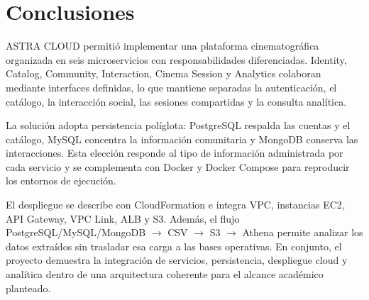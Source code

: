 ﻿\chapter{Conclusiones}
ASTRA CLOUD permitió implementar una plataforma cinematográfica organizada en seis microservicios con responsabilidades diferenciadas. Identity, Catalog, Community, Interaction, Cinema Session y Analytics colaboran mediante interfaces definidas, lo que mantiene separadas la autenticación, el catálogo, la interacción social, las sesiones compartidas y la consulta analítica.

La solución adopta persistencia políglota: PostgreSQL respalda las cuentas y el catálogo, MySQL concentra la información comunitaria y MongoDB conserva las interacciones. Esta elección responde al tipo de información administrada por cada servicio y se complementa con Docker y Docker Compose para reproducir los entornos de ejecución.

El despliegue se describe con CloudFormation e integra VPC, instancias EC2, API Gateway, VPC Link, ALB y S3. Además, el flujo PostgreSQL/MySQL/MongoDB $\rightarrow$ CSV $\rightarrow$ S3 $\rightarrow$ Athena permite analizar los datos extraídos sin trasladar esa carga a las bases operativas. En conjunto, el proyecto demuestra la integración de servicios, persistencia, despliegue cloud y analítica dentro de una arquitectura coherente para el alcance académico planteado.
